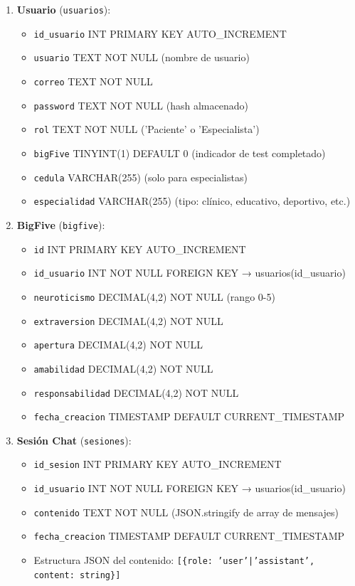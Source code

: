 \documentclass[12pt,a4paper]{report}
\numberwithin{figure}{section}
\begin{document}
\begin{enumerate}
  \item \textbf{Usuario} (\texttt{usuarios}):
  \begin{itemize}
    \item \texttt{id\_usuario} INT PRIMARY KEY AUTO\_INCREMENT
    \item \texttt{usuario} TEXT NOT NULL (nombre de usuario)
    \item \texttt{correo} TEXT NOT NULL
    \item \texttt{password} TEXT NOT NULL (hash almacenado)
    \item \texttt{rol} TEXT NOT NULL ('Paciente' o 'Especialista')
    \item \texttt{bigFive} TINYINT(1) DEFAULT 0 (indicador de test completado)
    \item \texttt{cedula} VARCHAR(255) (solo para especialistas)
    \item \texttt{especialidad} VARCHAR(255) (tipo: clínico, educativo, deportivo, etc.)
  \end{itemize}
  
  \item \textbf{BigFive} (\texttt{bigfive}):
  \begin{itemize}
    \item \texttt{id} INT PRIMARY KEY AUTO\_INCREMENT
    \item \texttt{id\_usuario} INT NOT NULL FOREIGN KEY → usuarios(id\_usuario)
    \item \texttt{neuroticismo} DECIMAL(4,2) NOT NULL (rango 0-5)
    \item \texttt{extraversion} DECIMAL(4,2) NOT NULL
    \item \texttt{apertura} DECIMAL(4,2) NOT NULL
    \item \texttt{amabilidad} DECIMAL(4,2) NOT NULL
    \item \texttt{responsabilidad} DECIMAL(4,2) NOT NULL
    \item \texttt{fecha\_creacion} TIMESTAMP DEFAULT CURRENT\_TIMESTAMP
  \end{itemize}
  
  \item \textbf{Sesión Chat} (\texttt{sesiones}):
  \begin{itemize}
    \item \texttt{id\_sesion} INT PRIMARY KEY AUTO\_INCREMENT
    \item \texttt{id\_usuario} INT NOT NULL FOREIGN KEY → usuarios(id\_usuario)
    \item \texttt{contenido} TEXT NOT NULL (JSON.stringify de array de mensajes)
    \item \texttt{fecha\_creacion} TIMESTAMP DEFAULT CURRENT\_TIMESTAMP
    \item Estructura JSON del contenido: \texttt{[\{role: 'user'|'assistant', content: string\}]}
  \end{itemize}
  

\end{enumerate}
\end{document}
